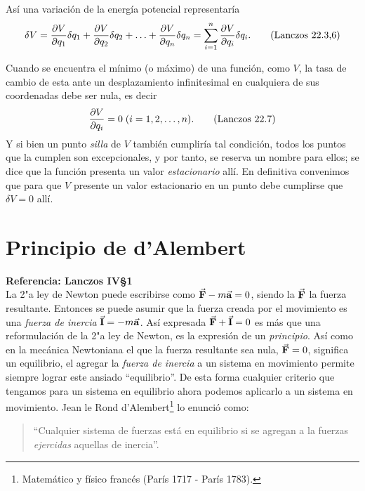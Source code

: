 \documentclass[12pt, spanish, a4paper, ]{article}
\begin{document}
Así una variación de la energía potencial representaría
\begin{equation}\label{Lanczos22.3,6}
    \delta V = 
	\pdv{V}{q_1} \delta q_1+ \pdv{V}{q_2} \delta q_2+ \ldots + \pdv{V}{q_n} \delta q_n =
	\sum^{n}_{i=1} \pdv{V}{q_i} \delta q_i.
    \tag{Lanczos 22.3,6}
\end{equation}

Cuando se encuentra el mínimo (o máximo) de una función, como \(V\), la tasa de cambio de esta ante un desplazamiento infinitesimal en cualquiera de sus coordenadas debe ser nula, es decir
\begin{equation}\label{Lanczos22.7}
	\pdv{V}{q_i} = 0\; (i= 1, 2, \ldots, n).
    \tag{Lanczos 22.7}
\end{equation}
Y si bien un punto \emph{silla} de \(V\) también cumpliría tal condición, todos los puntos que la cumplen son excepcionales, y por tanto, se reserva un nombre para ellos; se dice que la función presenta un valor \emph{estacionario} allí.
En definitiva convenimos que para que \(V\) presente un valor estacionario en un punto debe cumplirse que \(\delta V=0\) allí.


\section{Principio de d'Alembert}
\textbf{Referencia: Lanczos IV\S1}\\

La 2"a ley de Newton puede escribirse como \(\va{F}- m \va{a}= 0 \), siendo la \(\va{F}\) la fuerza resultante.
Entonces se puede asumir que la fuerza creada por el movimiento es una \emph{fuerza de inercia} \(\va{I}= - m \va{a}\).
Así expresada \(\va{F}+ \va{I}=0\) es más que una reformulación de la 2"a ley de Newton, es la expresión de un \emph{principio}.
Así como en la mecánica Newtoniana el que la fuerza resultante sea nula, \(\va{F}=0\), significa un equilibrio, el agregar la \emph{fuerza de inercia} a un sistema en movimiento permite siempre lograr este ansiado ``equilibrio''.
De esta forma cualquier criterio que tengamos para un sistema en equilibrio ahora podemos aplicarlo a un sistema en movimiento.
Jean le Rond d'Alembert\footnote{Matemático y físico francés (París 1717 - París 1783).} lo enunció como:
\begin{quote}
``Cualquier sistema de fuerzas está en equilibrio si se agregan a la fuerzas \emph{ejercidas} aquellas de inercia''.
\end{quote}
\end{document}
